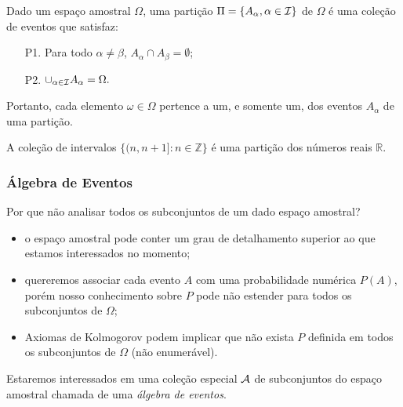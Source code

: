 %
\begin{frame}
\begin{defi}[Partição] Dado um espaço amostral $\Omega$, uma partição
$\Pi=\{A_{\alpha},\alpha\in{\cal I}\}$ de $\Omega$ é uma coleção de
eventos que satisfaz:
\begin{enumerate}
\item[P1.] Para todo $\alpha\neq\beta$, $A_{\alpha}\cap
A_{\beta}=\emptyset$;
%
\item[P2.] $\cup_{\alpha\in{\cal I}}A_{\alpha}=\Omega.$
\end{enumerate}
\end{defi}
%

Portanto, cada elemento
$\omega\in\Omega$ pertence a um, e somente um, dos eventos
$A_{\alpha}$ de uma partição.

\begin{exem}
A coleção de intervalos $\{(n,n+1]:n \in \mathbb{Z} \}$ é uma partição dos
números reais $\mathbb{R}$. 
\end{exem}

\end{frame}
%
%
\begin{frame}
\frametitle{\textbf{Álgebra de Eventos}}
\baselineskip=13pt
\begin{block}{}


Por que não analisar todos os subconjuntos de um dado espaço amostral?
\begin{itemize}
\item o espaço amostral pode conter um grau de
detalhamento superior ao que estamos interessados no momento;

\item quereremos associar cada
evento $A$ com uma probabilidade numérica $P(A)$, porém nosso conhecimento sobre $P$ pode não
estender para todos os subconjuntos de $\Omega$;

\item Axiomas de Kolmogorov podem implicar que não exista $P$ definida em
todos os subconjuntos de $\Omega$ (não enumerável).
\end{itemize}

Estaremos interessados em uma coleção especial ${\cal A}$ de subconjuntos do espaço amostral
chamada de uma {\em álgebra de eventos}.

\end{block}
\end{frame}
